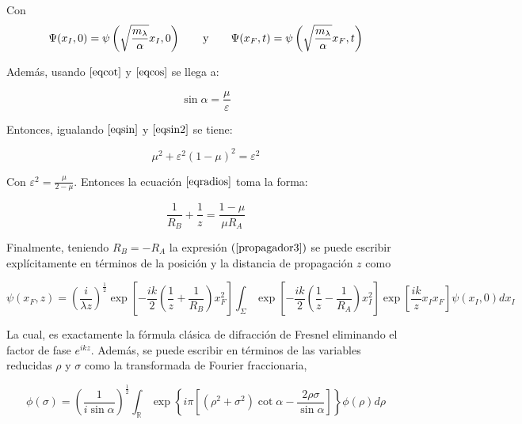     Con 
    \begin{equation}
        \Psi(x_{I},0) = \psi \left ( \sqrt{\frac{m_{\lambda}}{\alpha}}x_{I},0 \right ) \hspace{0.7cm} \mathrm{y} \hspace{0.7cm} \Psi(x_{F},t) = \psi \left ( \sqrt{\frac{m_{\lambda}}{\alpha}}x_{F},t \right )
    \end{equation}
    
    Además, usando $\ref{eqcot}$ y $\ref{eqcos}$ se llega a:
    
    \begin{equation}
        \sin \alpha = \frac{\mu}{\varepsilon}
        \label{eqsin2}
    \end{equation}
    
    Entonces, igualando $\ref{eqsin}$ y $\ref{eqsin2}$ se tiene:
    
    \begin{equation}
        \mu ^{2} + \varepsilon ^{2} (1-\mu)^{2} = \varepsilon ^{2}
    \end{equation}
    
    Con $\varepsilon ^{2} = \frac{\mu}{2- \mu}$. Entonces la ecuación $\ref{eqradios}$ toma la forma:
    
    \begin{equation}
        \frac{1}{R_{B}} + \frac{1}{z} = \frac{1-\mu}{\mu R_{A}}
    \end{equation}
    
    Finalmente, teniendo $R_{B} = -R_{A}$ la expresión $(\ref{propagador3})$ se puede escribir explícitamente en términos de la posición y la distancia de propagación $z$ como
    
    \begin{equation}
        \psi(x_{F},z) = \left ( \frac{i}{\lambda z} \right )^{\frac{1}{2}} \exp \left [ -\frac{ik}{2} \left ( \frac{1}{z} + \frac{1}{R_{B}} \right ) x_{F}^{2}  \right ] \int_{\Sigma} \exp \left [ -\frac{ik}{2} \left ( \frac{1}{z} - \frac{1}{R_{A}} \right ) x_{I}^{2}  \right ] \exp \left [ \frac{ik}{z} x_{I} x_{F} \right ] \psi (x_{I},0) dx_{I}
        \label{eq:fresnelclasica}
    \end{equation}
    
    La cual, es exactamente la fórmula clásica de difracción de Fresnel eliminando el factor de fase $e^{ikz}$. Además, se puede escribir en términos de las variables reducidas $\rho$ y $\sigma$ como la transformada de Fourier fraccionaria,
    
    \begin{equation}
        \phi (\sigma) = \left ( \frac{1}{i \sin \alpha} \right )^{\frac{1}{2}} \int_{\mathbb{R}} \exp \left \{ i \pi \left [ \left ( \rho^{2} + \sigma^{2} \right ) \cot \alpha - \frac{2 \rho \sigma}{\sin \alpha} \right ] \right \} \phi (\rho) d \rho
        \label{eq:FRFT}
    \end{equation}
    
